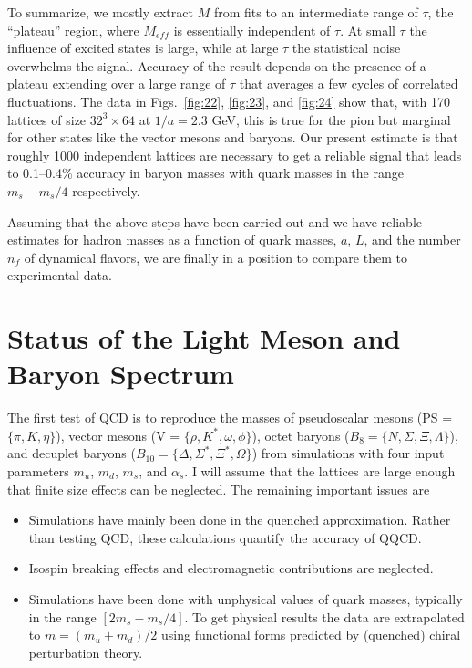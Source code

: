 To summarize, we mostly extract $M$ from fits to an intermediate range of $\tau$, the ``plateau'' region, where $M_{eff}$ is essentially independent of $\tau$. At small $\tau$ the influence of excited states is large, while at large $\tau$ the statistical noise overwhelms the signal. Accuracy of the result depends on the presence of a plateau extending over a large range of $\tau$ that averages a few cycles of correlated fluctuations. The data in Figs.~\ref{fig:22}, \ref{fig:23}, and \ref{fig:24} show that, with 170 lattices of size $32^3 \times 64$ at $1/a = 2.3$ GeV, this is true for the pion but marginal for other states like the vector mesons and baryons. Our present estimate is that roughly 1000 independent lattices are necessary to get a reliable signal that leads to 0.1--0.4\% accuracy in baryon masses with quark masses in the range $m_s - m_s/4$ respectively.

Assuming that the above steps have been carried out and we have reliable estimates for hadron masses as a function of quark masses, $a$, $L$, and the number $n_f$ of dynamical flavors, we are finally in a position to compare them to experimental data.

\section{Status of the Light Meson and Baryon Spectrum}

The first test of QCD is to reproduce the masses of pseudoscalar mesons (PS = $\{\pi, K, \eta\}$), vector mesons (V = $\{\rho, K^*, \omega, \phi\}$), octet baryons ($B_8 = \{N, \Sigma, \Xi, \Lambda\}$), and decuplet baryons ($B_{10} = \{\Delta, \Sigma^*, \Xi^*, \Omega\}$) from simulations with four input parameters $m_u$, $m_d$, $m_s$, and $\alpha_s$. I will assume that the lattices are large enough that finite size effects can be neglected. The remaining important issues are
\begin{itemize}
\item Simulations have mainly been done in the quenched approximation. Rather than testing QCD, these calculations quantify the accuracy of QQCD.
\item Isospin breaking effects and electromagnetic contributions are neglected.
\item Simulations have been done with unphysical values of quark masses, typically in the range $[2m_s - m_s/4]$. To get physical results the data are extrapolated to $m = (m_u + m_d)/2$ using functional forms predicted by (quenched) chiral perturbation theory.
\end{itemize}

